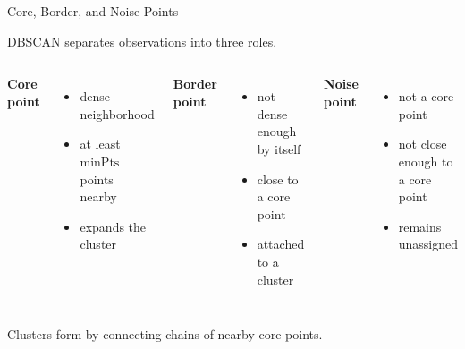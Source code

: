 \documentclass[aspectratio=169]{beamer}
\begin{document}
\begin{frame}{Core, Border, and Noise Points}

DBSCAN separates observations into three roles.

\vspace{0.8em}

\begin{columns}[T,onlytextwidth]

\textbf{Core point}
\begin{itemize}
\item dense neighborhood
\item at least \(\mathrm{minPts}\) points nearby
\item expands the cluster
\end{itemize}

\textbf{Border point}
\begin{itemize}
\item not dense enough by itself
\item close to a core point
\item attached to a cluster
\end{itemize}

\textbf{Noise point}
\begin{itemize}
\item not a core point
\item not close enough to a core point
\item remains unassigned
\end{itemize}

\end{columns}

\vspace{0.8em}

Clusters form by connecting chains of nearby core points.

\end{frame}

\end{document}
